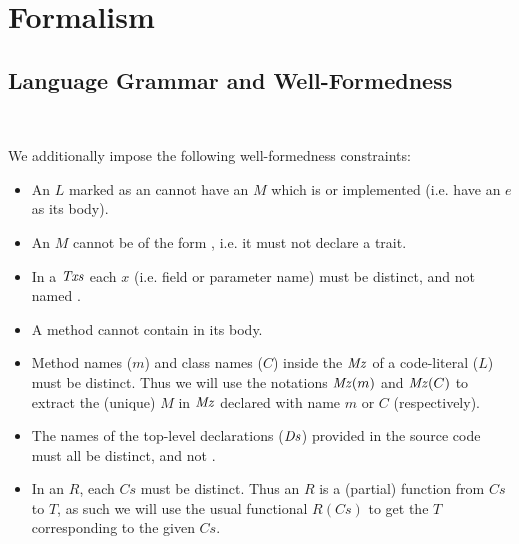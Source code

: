 \section{Formalism}
\subsection{Language Grammar and Well-Formedness}
\noindent
\newlength{\gramwidth}
\setlength{\gramwidth}{\dimexpr\textwidth-1em}
\begin{minipage}[t]{0.6\gramwidth}
\begin{grammar}
\end{grammar}
\end{minipage}\hfil
\begin{minipage}[t]{0.4\gramwidth}
\begin{grammar}
	\\
\end{grammar}
\end{minipage}

We additionally impose the following well-formedness constraints:
\begin{itemize}
	\item An $L$ marked as an  cannot have an $M$ which is  or implemented (i.e. have an $e$ as its body).
	\item An $M$ cannot be of the form , i.e. it must not declare a trait.
	\item In a $\mathit{Txs}$ each $x$ (i.e. field or parameter name) must be distinct, and not named . 
	\item A  method cannot contain  in its body.
	\item Method names ($m$) and class names ($C$) inside the $\mathit{Mz}$ of a code-literal ($L$) must be distinct. Thus we will use the notations $\mathit{Mz}(m)$ and $\mathit{Mz}(C)$ to extract the (unique) $M$ in $\mathit{Mz}$ declared with name $m$ or $C$ (respectively).
	
	\item The names of the top-level declarations ($\mathit{Ds}$) provided in the source code must all be distinct, and not \This.
	\item In an $R$, each $Cs$ must be distinct. Thus an $R$ is a (partial) function from $Cs$ to $T$, as such we will use the usual functional $R(Cs)$ to get the $T$ corresponding to the given $Cs$.
\end{itemize}


